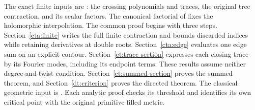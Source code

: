 \documentclass[11pt]{article}
\numberwithin{equation}{section}
\theoremstyle{definition}\newtheorem{definition}[theorem]{Definition}
\theoremstyle{remark}\newtheorem{remark}[theorem]{Remark}
\begin{document}
The exact finite inputs are \cite[Proposition~6.1, Theorem~7.1 and
Proposition~8.1]{Meridian}: the crossing polynomials and traces, the
original tree contraction, and its scalar factors. The canonical
factorial of \cite[Lemma~2.1]{ConwayAnalysis} fixes the holomorphic
interpolation. The common proof begins with three steps.
Section~\ref{cta:finite} writes the full finite contraction and
bounds discarded indices while retaining derivatives at double roots.
Section~\ref{cta:edge} evaluates one edge sum on an explicit contour.
Section~\ref{ct:trace-section} expresses each closing trace by its
Fourier modes, including its endpoint terms. These results assume neither degree-and-twist
condition. Section~\ref{ct:summed-section} proves the summed theorem,
and Section~\ref{dt:criterion} proves the directed theorem.
The classical geometric input is \cite[Theorem~1.1]{Geometry}.
Each analytic proof checks its threshold and identifies its own
critical point with the original primitive filled metric.












\end{document}
